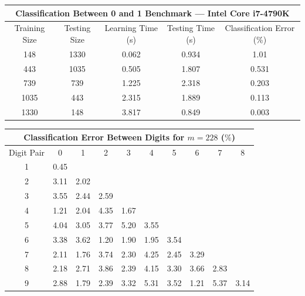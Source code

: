 \documentclass{article}[12pt]
\begin{document}
\begin{enumerate}
\begin{table}[h]
\centering
\begin{tabular}{|c|c|c|c|c|} \hline
\multicolumn{5}{|c|}{Classification Between 0 and 1 Benchmark --- Intel Core i7-4790K} \\ \hline
 Training Size & Testing Size & Learning Time (s) & Testing Time (s) & Classification Error (\%) \\ \hline \hline
  148 & 1330 & 0.062 & 0.934 & 1.01 \\ \hline
  443 & 1035 & 0.505 & 1.807 & 0.531 \\ \hline
  739 & 739 & 1.225 & 2.318 & 0.203 \\ \hline
  1035 & 443 & 2.315 & 1.889 & 0.113 \\ \hline
  1330 & 148 & 3.817 & 0.849 & 0.003 \\ \hline
\end{tabular}

\end{table}

\begin{table}
\centering
\begin{tabular}{|c||c|c|c|c|c|c|c|c|c|} \hline
\multicolumn{10}{|c|}{Classification Error Between Digits for $m=228$ ($\%$)} \\ \hline
Digit Pair &0& 1& 2& 3& 4& 5& 6& 7& 8 \\ \hline \hline
1 &0.45  & & & & & & & & \\ \hline
2 &3.11  &2.02  & & & & & & &\\ \hline
3 &3.55  &2.44  &2.59  & & & &  & &\\ \hline
4 &1.21  &2.04  &4.35  &1.67  & & & &  &\\ \hline
5 &4.04  &3.05  &3.77  &5.20  &3.55  & &  & &\\ \hline
6 &3.38  &3.62  &1.20  &1.90  &1.95  &3.54  & & &\\ \hline
7 &2.11  &1.76  &3.74  &2.30  &4.25  &2.45  &3.29  &  &\\ \hline
8 &2.18  &2.71  &3.86  &2.39  &4.15  &3.30  &3.66  &2.83   &\\ \hline
9 &2.88  &1.79  &2.39  &3.32  &5.31  &3.52  &1.21  &5.37  &3.14  \\ \hline
\end{tabular}
\end{table}
\end{enumerate}
\end{document}
